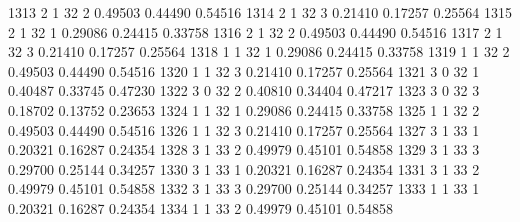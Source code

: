 \documentclass{article}
\begin{document}
\begin{Woutput}
1313      2       1      32       2       0.49503    0.44490    0.54516
1314      2       1      32       3       0.21410    0.17257    0.25564
1315      2       1      32       1       0.29086    0.24415    0.33758
1316      2       1      32       2       0.49503    0.44490    0.54516
1317      2       1      32       3       0.21410    0.17257    0.25564
1318      1       1      32       1       0.29086    0.24415    0.33758
1319      1       1      32       2       0.49503    0.44490    0.54516
1320      1       1      32       3       0.21410    0.17257    0.25564
1321      3       0      32       1       0.40487    0.33745    0.47230
1322      3       0      32       2       0.40810    0.34404    0.47217
1323      3       0      32       3       0.18702    0.13752    0.23653
1324      1       1      32       1       0.29086    0.24415    0.33758
1325      1       1      32       2       0.49503    0.44490    0.54516
1326      1       1      32       3       0.21410    0.17257    0.25564
1327      3       1      33       1       0.20321    0.16287    0.24354
1328      3       1      33       2       0.49979    0.45101    0.54858
1329      3       1      33       3       0.29700    0.25144    0.34257
1330      3       1      33       1       0.20321    0.16287    0.24354
1331      3       1      33       2       0.49979    0.45101    0.54858
1332      3       1      33       3       0.29700    0.25144    0.34257
1333      1       1      33       1       0.20321    0.16287    0.24354
1334      1       1      33       2       0.49979    0.45101    0.54858


\end{Woutput}
\end{document}
